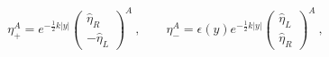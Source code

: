 \begin{equation} \label{solutkillingspin}
       \eta_+^A=e^{-\frac{1}{2}k|y|}\left(\begin{array}{c}\hat{\eta}_R\\-\hat{\eta}_L\end{array}\right)^A\ ,\qquad \eta_-^A=\epsilon(y)e^{-\frac{1}{2}k|y|}\left(\begin{array}{c}\hat{\eta}_L\\\hat{\eta}_R\end{array}\right)^A\ ,
       \end{equation} 
